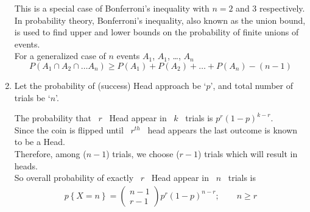 \documentclass[11pt]{article}
\begin{document}
\begin{enumerate}[1: ]
	This is a special case of Bonferroni's inequality with $n=2$ and $3$
	respectively.
	\\

	In probability theory, Bonferroni's inequality, also known as the
	union bound, is used to find upper and lower bounds on the probability
	of finite unions of events.\\

	For a generalized case of $n$ events $A_1$, $A_1$, \ldots, $A_n$
	\begin{equation*}
		P(A_1\cap A_2\cap \ldots A_n) \ge P(A_1) + P(A_2) + \ldots
			+ P(A_n) -(n-1)
	\end{equation*}

\item Let the probability of (success) Head approach be `$p$', and total 
	number of trials be `$n$'.

	The probability that \ $r$ \ Head appear in \ $k$ \ trials is \quad
	$\displaystyle p^r (1-p)^{k-r}$. \\
	Since the coin is flipped until \ $r^{th}$ \ head appears the last
	outcome is known to be a Head.
	\\

		Therefore, among ($n-1$) trials, we choose ($r-1$) trials which
	will result in heads. \\
	
	So overall probability of exactly \ $r$ \ Head appear in \ $n$ \ trials
	is
	\begin{align*} 
		p\left\{X=n\right\} = 
		\begin{pmatrix}
		n-1 \\ r-1
		\end{pmatrix}
		p^r (1-p)^{n-r}; \qquad n \ge r
	\end{align*} 


\end{enumerate}
\end{document}
